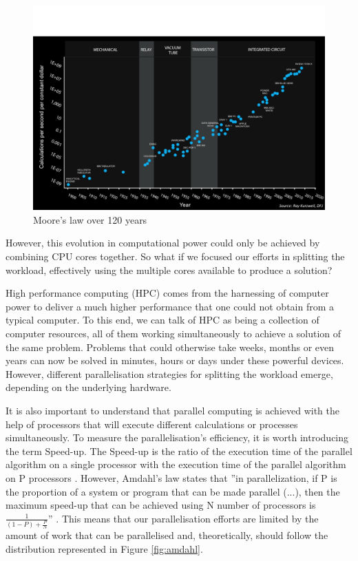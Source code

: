 \documentclass[12pt, openany]{book}
\begin{document}
\begin{figure}[H]
\centering
  \includegraphics[width=0.6\linewidth]{Resources/Images/moore120.png}
  \caption{Moore's law over 120 years}
  \label{fig:moore}
\end{figure}

However, this evolution in computational power could only be achieved by combining CPU cores together.
So what if we focused our efforts in splitting the workload, effectively using the multiple cores available to produce a solution?\par
High performance computing (HPC) comes from the harnessing of computer power to deliver a much higher performance that one could not obtain from a typical computer. To this end, we can talk of HPC as being a collection of computer resources, all of them working simultaneously to achieve a solution of the same problem. Problems that could otherwise take weeks, months or even years can now be solved in minutes, hours or days under these powerful devices. However, different parallelisation strategies for splitting the workload emerge, depending on the underlying hardware. \par
It is also important to understand that parallel computing is achieved with the help of processors that will execute different calculations or processes simultaneously. To measure the parallelisation's efficiency, it is worth introducing the term Speed-up. The Speed-up is the ratio of the execution time of the parallel algorithm on a single processor with the execution time of the parallel algorithm on P processors \cite{irenehpc}. However, Amdahl's law states that ''in parallelization, if P is the proportion of a system or program that can be made parallel (...), then the maximum speed-up that can be achieved using N number of processors is $\frac{1}{\left(1-P\right)+\frac{P}{N}}$'' \cite{amdahl}. This means that our parallelisation efforts are limited by the amount of work that can be parallelised and, theoretically, should follow the distribution represented in Figure \ref{fig:amdahl}. 
\end{document}
